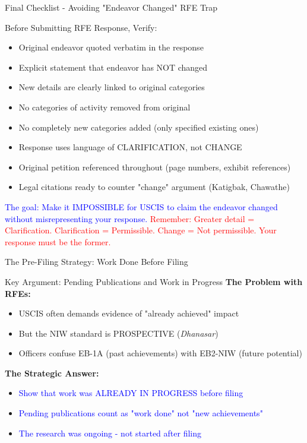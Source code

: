 \documentclass[11pt]{beamer}
\begin{document}
	\begin{frame}{Final Checklist - Avoiding "Endeavor Changed" RFE Trap}
		\scriptsize
		\begin{block}{Before Submitting RFE Response, Verify:}
			\begin{itemize}
				\item [$\square$] Original endeavor quoted verbatim in the response
				\item [$\square$] Explicit statement that endeavor has NOT changed
				\item [$\square$] New details are clearly linked to original categories
				\item [$\square$] No categories of activity removed from original
				\item [$\square$] No completely new categories added (only specified existing ones)
				\item [$\square$] Response uses language of CLARIFICATION, not CHANGE
			\item [$\square$] Original petition referenced throughout (page numbers, exhibit references)
			\item [$\square$] Legal citations ready to counter "change" argument (Katigbak, Chawathe)
		\end{itemize}
		\textcolor{blue}{The goal: Make it IMPOSSIBLE for USCIS to claim the endeavor changed without misrepresenting your response.}
		\vspace{0.2cm}
		\textcolor{red}{Remember: Greater detail = Clarification. Clarification = Permissible. Change = Not permissible. Your response must be the former.}
	\end{block}
	\end{frame}
	
	\begin{frame}{The Pre-Filing Strategy: Work Done Before Filing}
		\scriptsize
		\begin{block}{Key Argument: Pending Publications and Work in Progress}
			\textbf{The Problem with RFEs:}
			\begin{itemize}
				\item USCIS often demands evidence of "already achieved" impact
				\item But the NIW standard is PROSPECTIVE (\textit{Dhanasar})
				\item Officers confuse EB-1A (past achievements) with EB2-NIW (future potential)
			\end{itemize}
			\textbf{The Strategic Answer:}
			\begin{itemize}
				\item \textcolor{blue}{Show that work was ALREADY IN PROGRESS before filing}
				\item \textcolor{blue}{Pending publications count as "work done" not "new achievements"}
				\item \textcolor{blue}{The research was ongoing - not started after filing}
			\end{itemize}
		\end{block}
	\end{frame}
	
\end{document}
